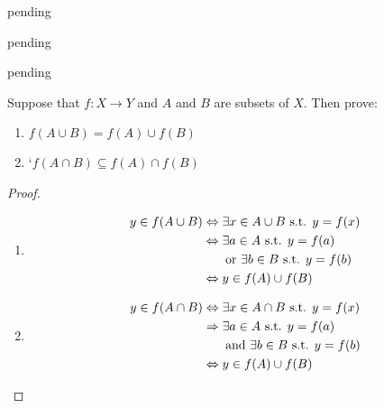 \begin{exercise} \label{0.41}
	pending
\end{exercise}

\begin{exercise} \label{0.42}
	pending
\end{exercise}

\begin{exercise} \label{0.43}
	pending
\end{exercise}

\begin{exercise} \label{0.44}
	Suppose that $f:X \rightarrow Y$ and $A$ and $B$ are subsets of $X$. Then prove:
	\begin{enumerate}[label=(\alph*)]
	    \item $f\left( A \cup B \right) = f(A) \cup f(B)$
	    \item`$f(A\cap B) \subseteq f(A) \cap f(B)$
	\end{enumerate}
	
	\begin{proof}
	    \begin{enumerate}[label=(\alph*)]
	        \item 
	        \begin{align*}
	            y \in f(A \cup B) &\Leftrightarrow \exists x \in A \cup B \text{ s.t. } y = f(x) \\
	            &\Leftrightarrow \exists a \in A \text{ s.t. } y=f(a) \\
	            &\text{ } \hspace{4mm} \text{ or } \exists b \in B \text{ s.t. } y = f(b) \\
	            &\Leftrightarrow y \in f(A) \cup f(B)
	        \end{align*}
	        \item
	        \begin{align*}
	            y \in f(A \cap B) &\Leftrightarrow \exists x \in A \cap B \text{ s.t. } y = f(x) \\
	            &\Rightarrow \exists a \in A \text{ s.t. } y=f(a) \\
	            &\text{ } \hspace{4mm} \text{ and } \exists b \in B \text{ s.t. } y = f(b) \\
	            &\Leftrightarrow y \in f(A) \cup f(B)
	        \end{align*}
	    \end{enumerate}
	\end{proof}
\end{exercise}

